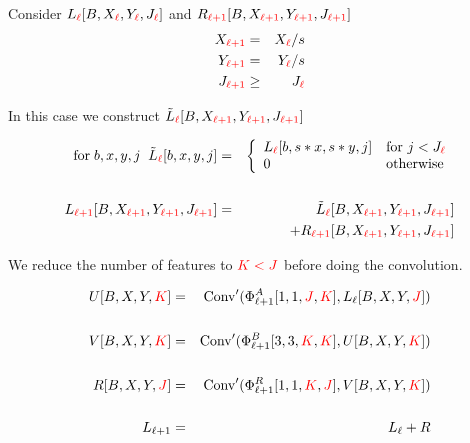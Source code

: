 {

Consider $L_{\color{red} \ell}[B,X_{\color{red} \ell},Y_{\color{red} \ell},J_{\color{red} \ell}]$ and $R_{\color{red} \ell+1}[B,X_{\color{red} \ell+1},Y_{\color{red} \ell+1},J_{\color{red} \ell+1}]$
\begin{eqnarray*}
X_{\color{red} \ell+1} & = & X_{\color{red} \ell}/s \\
Y_{\color{red} \ell+1} & = & Y_{\color{red} \ell}/s \\
J_{\color{red} \ell+1} & \geq &  J_{\color{red} \ell}
\end{eqnarray*}


\vfill
In this case we construct $\tilde{L}_{\color{red} \ell}[B,X_{\color{red} \ell +1},Y_{\color{red} \ell+1},J_{\color{red}\ell +1}]$

\begin{eqnarray*}
\mathrm{for}\;b,x,y,j\;\;\tilde{L}_{\color{red} \ell}[b,x,y,j] & = & \left\{\begin{array}{ll} L_{\color{red} \ell}[b,s*x,s*y,j] & \mbox{for $j < J_{\color{red} \ell}$} \\ 0 & \mbox{otherwise} \end{array}\right.\\
\\
L_{\color{red} \ell+1}[B,X_{\color{red} \ell +1},Y_{\color{red} \ell+1},J_{\color{red}\ell +1}] & = & \tilde{L}_{\color{red} \ell}[B,X_{\color{red} \ell +1},Y_{\color{red} \ell+1},J_{\color{red}\ell +1}] \\
& & + R_{\color{red} \ell+1}[B,X_{\color{red} \ell +1},Y_{\color{red} \ell+1},J_{\color{red}\ell +1}]
\end{eqnarray*}


We reduce the number of features to ${\color{red} K < J}$ before doing the convolution.

{\huge
\begin{eqnarray*}
U[B,X,Y,{\color{red} K}] & = & \mathrm{Conv}'(\Phi^A_{\ell+1}{ [1,1,{\color{red} J},{\color{red} K}]},L_\ell[B,X,Y,{\color{red} J}]) \\
\\
V[B,X,Y,{\color{red} K}] & = & \mathrm{Conv}'(\Phi^B_{\ell+1}{[3,3,{\color{red} K},{\color{red} K}]},U[B,X,Y,{\color{red} K}]) \\
\\
R[B,X,Y,{\color{red} J}] & = & \mathrm{Conv}'(\Phi^R_{\ell+1}{ [1,1,{\color{red} K},{\color{red} J}]},V[B,X,Y,{\color{red} K}]) \\
\\
L_{ \ell+1} & = & L_\ell + R
\end{eqnarray*}
}

}
